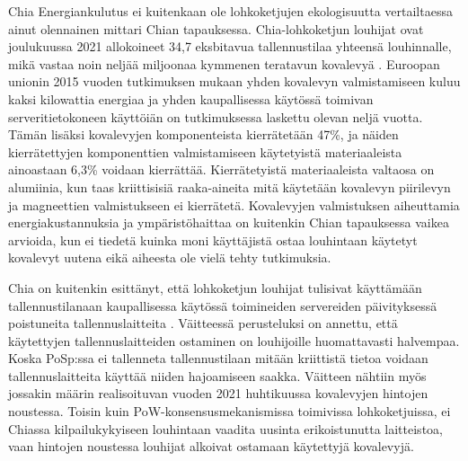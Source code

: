 \begin{subsection}{Chia\label{chia}}
Energiankulutus ei kuitenkaan ole lohkoketjujen ekologisuutta vertailtaessa ainut olennainen mittari Chian tapauksessa. Chia-lohkoketjun louhijat ovat joulukuussa 2021 allokoineet 34,7 eksbitavua tallennustilaa yhteensä louhinnalle, mikä vastaa noin neljää miljoonaa kymmenen teratavun kovalevyä \cite{chiaspaceusage}. Euroopan unionin 2015 vuoden tutkimuksen mukaan yhden kovalevyn valmistamiseen kuluu kaksi kilowattia energiaa \cite[p~49--50]{manufacturingcarbon1} ja yhden kaupallisessa käytössä toimivan serveritietokoneen käyttöiän on tutkimuksessa laskettu olevan neljä vuotta. Tämän lisäksi kovalevyjen komponenteista kierrätetään 47\%, ja näiden kierrätettyjen komponenttien valmistamiseen käytetyistä materiaaleista ainoastaan 6,3\% voidaan kierrättää. Kierrätetyistä materiaaleista valtaosa on alumiinia, kun taas kriittisisiä raaka-aineita mitä käytetään kovalevyn piirilevyn ja magneettien valmistukseen ei kierrätetä. Kovalevyjen valmistuksen aiheuttamia energiakustannuksia ja ympäristöhaittaa on kuitenkin Chian tapauksessa vaikea arvioida, kun ei tiedetä kuinka moni käyttäjistä ostaa louhintaan käytetyt kovalevyt uutena eikä aiheesta ole vielä tehty tutkimuksia.

Chia on kuitenkin esittänyt, että lohkoketjun louhijat tulisivat käyttämään tallennustilanaan kaupallisessa käytössä toimineiden servereiden päivityksessä poistuneita tallennuslaitteita \cite{chia-mining}. Väitteessä perusteluksi on annettu, että käytettyjen tallennuslaitteiden ostaminen on louhijoille huomattavasti halvempaa. Koska PoSp:ssa ei tallenneta tallennustilaan mitään kriittistä tietoa voidaan tallennuslaitteita käyttää niiden hajoamiseen saakka. Väitteen nähtiin myös jossakin määrin realisoituvan vuoden 2021 huhtikuussa kovalevyjen hintojen noustessa. Toisin kuin PoW-konsensusmekanismissa toimivissa lohkoketjuissa, ei Chiassa kilpailukykyiseen louhintaan vaadita uusinta erikoistunutta laitteistoa, vaan hintojen noustessa louhijat alkoivat ostamaan käytettyjä kovalevyjä.
\end{subsection}